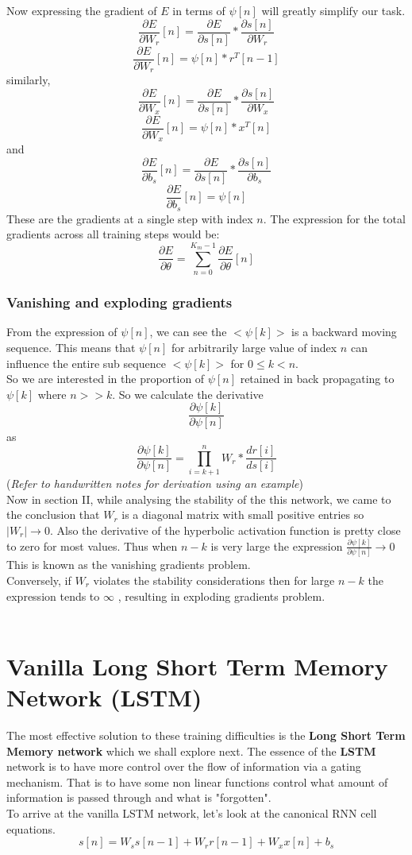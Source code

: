 \documentclass[12pt,a4paper]{article}
\begin{document}
{Now expressing the gradient of $E$ in terms of $\psi[n]$ will greatly simplify our task.
\[
\frac{\partial{E}}{\partial{W_{r}}}[n] = 
\frac{\partial{E}}{\partial{s[n]}}*\frac{\partial{s[n]}}{\partial{W_{r}}} \tag{8}
\]
\[
\frac{\partial{E}}{\partial{W_{r}}}[n] = \psi[n]*r^{T}[n-1]\tag{9}
\]
similarly,
\[
\frac{\partial{E}}{\partial{W_{x}}}[n] = \frac{\partial{E}}{\partial{s[n]}}*\frac{\partial{s[n]}}{\partial{W_{x}}}\tag{10}
\]
\[
\frac{\partial{E}}{\partial{W_{x}}}[n] = \psi[n]*x^{T}[n]\tag{11}
\]
and
\[
\frac{\partial{E}}{\partial{b_{s}}}[n] = \frac{\partial{E}}{\partial{s[n]}}*\frac{\partial{s[n]}}{\partial{b_{s}}}\tag{12}
\]
\[
\frac{\partial{E}}{\partial{b_{s}}}[n] = \psi[n]\tag{13}
\]
These are the gradients at a single step with index $n$.
The expression for the total gradients across all training steps would be:
\[
\frac{\partial{E}}{\partial{\theta}} = \sum_{n=0}^{K_{m}-1} \frac{\partial{E}}{\partial{\theta}}[n]\tag{14}
\]
\subsubsection{Vanishing and exploding gradients}
From the expression of $\psi[n]$, we can see the $<\psi[k]>$ is a backward moving sequence. This means that $\psi[n]$ for arbitrarily large value of index $n$ can influence the entire sub sequence $<\psi[k]>$ for $0\leq k<n$.\\
So we are interested in the proportion of $\psi[n]$ retained in back propagating to $\psi[k]$ where $n>>k$.
So we calculate the derivative
\[
\frac{\partial{\psi[k]}}{\partial{\psi[n]}}\tag{15}
\] as
\[
\frac{\partial{\psi[k]}}{\partial{\psi[n]}}=
\prod_{i=k+1}^{n} W_{r}*\frac{dr[i]}{ds[i]}\tag{16}
\]
(\textit{Refer to handwritten notes for derivation using an example})\\
Now in section II, while analysing the stability of the this network, we came to the conclusion that $W_{r}$ is a diagonal matrix with small positive entries so $|W_{r}|\rightarrow{0} $.
Also the derivative of the hyperbolic activation function is pretty close to zero for most values.
Thus when $n-k$ is very large the expression $\frac{\partial{\psi[k]}}{\partial{\psi[n]}} \rightarrow{0}$
This is known as the vanishing gradients problem.
\\
Conversely, if $W_{r}$ violates the stability considerations then for large $n-k$ the expression tends to $\infty$ , resulting in exploding gradients problem.
\\
\\
\section{Vanilla Long Short Term Memory Network (LSTM)}
The most effective solution to these training difficulties is the \textbf{Long Short Term Memory network} which we shall explore next.
The essence of the \textbf{LSTM} network is to have more control over the flow of information via a gating mechanism. That is to have some non linear functions control what amount of information is passed through and what is "forgotten".
\\
To arrive at the vanilla LSTM network, let's look at the canonical RNN cell equations.
\[
s[n] = W_{s}s[n-1]+W_{r}r[n-1]+W_{x}x[n]+b_{s}\tag{17}
\]


}
\end{document}
